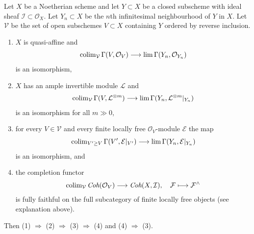 \begin{lemma}
\label{lemma-completion-fully-faithful-general}
Let $X$ be a Noetherian scheme and let $Y \subset X$ be a closed subscheme
with ideal sheaf $\mathcal{I} \subset \mathcal{O}_X$.
Let $Y_n \subset X$ be the $n$th infinitesimal neighbourhood of $Y$ in $X$.
Let $\mathcal{V}$ be the set of open subschemes $V \subset X$ containing $Y$
ordered by reverse inclusion.
\begin{enumerate}
\item $X$ is quasi-affine and
$$
\mathop{\mathrm{colim}}\nolimits_\mathcal{V} \Gamma(V, \mathcal{O}_V)
\longrightarrow
\mathop{\mathrm{lim}}\nolimits \Gamma(Y_n, \mathcal{O}_{Y_n})
$$
is an isomorphism,
\item $X$ has an ample invertible module $\mathcal{L}$ and
$$
\mathop{\mathrm{colim}}\nolimits_\mathcal{V} \Gamma(V, \mathcal{L}^{\otimes m})
\longrightarrow
\mathop{\mathrm{lim}}\nolimits \Gamma(Y_n, \mathcal{L}^{\otimes m}|_{Y_n})
$$
is an isomorphism for all $m \gg 0$,
\item for every $V \in \mathcal{V}$ and every finite locally free
$\mathcal{O}_V$-module $\mathcal{E}$ the map
$$
\mathop{\mathrm{colim}}\nolimits_{V' \geq V} \Gamma(V', \mathcal{E}|_{V'})
\longrightarrow
\mathop{\mathrm{lim}}\nolimits \Gamma(Y_n, \mathcal{E}|_{Y_n})
$$
is an isomorphism, and
\item the completion functor
$$
\mathop{\mathrm{colim}}\nolimits_\mathcal{V} \textit{Coh}(\mathcal{O}_V)
\longrightarrow
\textit{Coh}(X, \mathcal{I}),
\quad
\mathcal{F} \longmapsto \mathcal{F}^\wedge
$$
is fully faithful on the full subcategory of
finite locally free objects (see explanation above).
\end{enumerate}
Then (1) $\Rightarrow$ (2) $\Rightarrow$ (3) $\Rightarrow$ (4)
and (4) $\Rightarrow$ (3).
\end{lemma}


